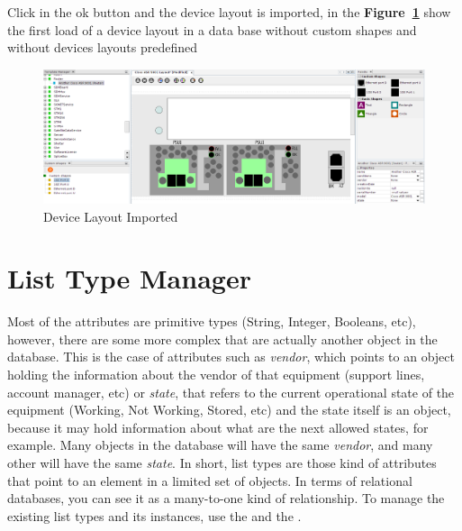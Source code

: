 \documentclass[a4paper]{article}
\begin{document}
	Click in the ok button and the device layout is imported, in the \textbf{Figure~\ref{fig:device_layout_imported}}  show the first load of a device layout in a data base without custom shapes and without devices layouts predefined
	
	\begin{figure}[h!]
		\centering
		\includegraphics[width=0.9\linewidth]{img/device_layout_imported.png}
		\caption{Device Layout Imported}
		\label{fig:device_layout_imported}
	\end{figure}
			
	\clearpage
	\section{List Type Manager} \label{sec:list_type_manager}
	Most of the attributes are primitive types (String, Integer, Booleans, etc), however, there are some more complex that are actually another object in the database. This is the case of attributes such as \textit{vendor}, which points to an object holding the information about the vendor of that equipment (support lines, account manager, etc) or \textit{state}, that refers to the current operational state of the equipment (Working, Not Working, Stored, etc) and the state itself is an object, because it may hold information about what are the next allowed states, for example. Many objects in the database will have the same \textit{vendor}, and many other will have the same \textit{state}. In short, list types are those kind of attributes that point to an element in a limited set of objects. In terms of relational databases, you can see it as a many-to-one kind of relationship. To manage the existing list types and its instances, use the \textbf{} and the \textbf{}. \newline
	
\end{document}
